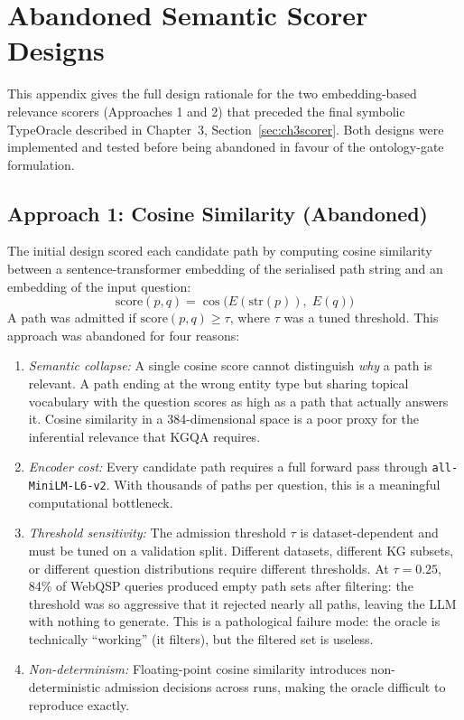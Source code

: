 
\chapter{Abandoned Semantic Scorer Designs}
\label{AppendixC}

This appendix gives the full design rationale for the two embedding-based relevance scorers (Approaches 1 and 2) that preceded the final symbolic TypeOracle described in Chapter~3, Section~\ref{sec:ch3scorer}. Both designs were implemented and tested before being abandoned in favour of the ontology-gate formulation.

\section{Approach 1: Cosine Similarity (Abandoned)}

The initial design scored each candidate path by computing cosine similarity between a sentence-transformer embedding of the serialised path string and an embedding of the input question:
\begin{equation}
  \text{score}(p, q) = \cos\!\bigl(E(\text{str}(p)),\; E(q)\bigr)
  \label{eq:appc_cosine_v1}
\end{equation}
A path was admitted if $\text{score}(p, q) \geq \tau$, where $\tau$ was a tuned threshold. This approach was abandoned for four reasons:

\begin{enumerate}
  \item \textit{Semantic collapse:} A single cosine score cannot distinguish \textit{why} a path is relevant. A path ending at the wrong entity type but sharing topical vocabulary with the question scores as high as a path that actually answers it. Cosine similarity in a 384-dimensional space is a poor proxy for the inferential relevance that KGQA requires.
  \item \textit{Encoder cost:} Every candidate path requires a full forward pass through \texttt{all-MiniLM-L6-v2}. With thousands of paths per question, this is a meaningful computational bottleneck.
  \item \textit{Threshold sensitivity:} The admission threshold $\tau$ is dataset-dependent and must be tuned on a validation split. Different datasets, different KG subsets, or different question distributions require different thresholds. At $\tau = 0.25$, 84\% of WebQSP queries produced empty path sets after filtering: the threshold was so aggressive that it rejected nearly all paths, leaving the LLM with nothing to generate. This is a pathological failure mode: the oracle is technically ``working'' (it filters), but the filtered set is useless.
  \item \textit{Non-determinism:} Floating-point cosine similarity introduces non-deterministic admission decisions across runs, making the oracle difficult to reproduce exactly.
\end{enumerate}


